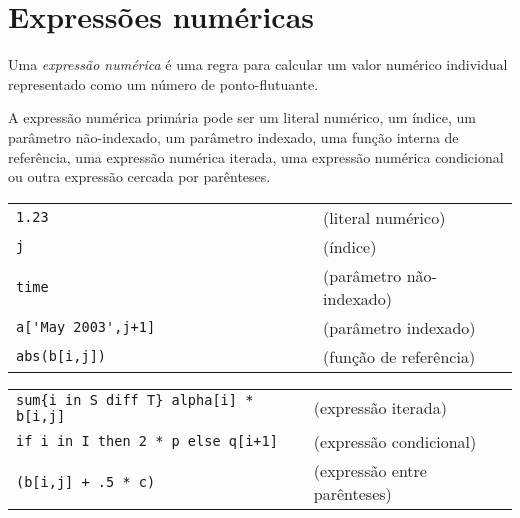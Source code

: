 \documentclass[11pt, brazil]{report}
\def\para#1{\noindent{\bf#1}}
\begin{document}
\vspace*{-8pt}

\section{Expressões numéricas}

Uma {\it expressão numérica} é uma regra para calcular um valor numérico individual
representado como um número de ponto-flutuante.

A expressão numérica primária pode ser um literal numérico, um índice,
um parâmetro não-indexado, um parâmetro indexado, uma função interna de
referência, uma expressão numérica iterada, uma expressão numérica condicional
ou outra expressão cercada por parênteses.

%

\para{Exemplos}

\noindent
\begin{tabular}{@{}ll@{}}
\verb|1.23                                |&(literal numérico)\\
\verb|j|&(índice)\\
\verb|time|&(parâmetro não-indexado)\\
\verb|a['May 2003',j+1]|&(parâmetro indexado)\\
\verb|abs(b[i,j])|&(função de referência)\\
\end{tabular}


\newpage

\noindent
\begin{tabular}{@{}ll@{}}
\verb|sum{i in S diff T} alpha[i] * b[i,j]|&(expressão iterada)\\
\verb|if i in I then 2 * p else q[i+1]|&(expressão condicional)\\
\verb|(b[i,j] + .5 * c)|&(expressão entre parênteses)\\
\end{tabular}
\end{document}
